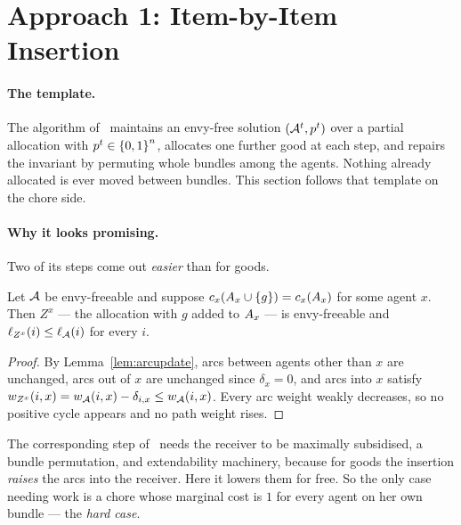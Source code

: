 \section{Approach 1: Item-by-Item Insertion}
\label{sec:approach1}

\paragraph{The template.} The algorithm of~\cite{BKNS22} maintains an envy-free
solution $(\mathcal{A}^t, p^t)$ over a partial allocation with
$p^t \in \left\{0,1\right\}^n$, allocates one further good at each step, and
repairs the invariant by permuting whole bundles among the agents. Nothing
already allocated is ever moved between bundles. This section follows that
template on the chore side.

\paragraph{Why it looks promising.} Two of its steps come out \emph{easier} than
for goods.

\begin{theorem}
\label{thm:freeinsert}
Let $\mathcal{A}$ be envy-freeable and suppose $c_x(A_{x} \cup \left\{g\right\}) =
c_x(A_{x})$ for some agent $x$. Then $Z^x$ --- the allocation with $g$
added to $A_{x}$ --- is envy-freeable and $\ell_{Z^x}(i) \le
\ell_{\mathcal{A}}(i)$ for every $i$.
\end{theorem}

\begin{proof}
By Lemma~\ref{lem:arcupdate}, arcs between agents other than $x$ are unchanged,
arcs out of $x$ are unchanged since $\delta_x = 0$, and arcs into $x$ satisfy
$w_{Z^x}(i,x) = w_{\mathcal{A}}(i,x) - \delta_{i,x} \le w_{\mathcal{A}}(i,x)$.
Every arc weight weakly decreases, so no positive cycle appears and no path
weight rises.
\end{proof}

The corresponding step of~\cite{BKNS22} needs the receiver to be maximally
subsidised, a bundle permutation, and extendability machinery, because for goods
the insertion \emph{raises} the arcs into the receiver. Here it lowers them for
free. So the only case needing work is a chore whose marginal cost is $1$ for
every agent on her own bundle --- the \emph{hard case}.

